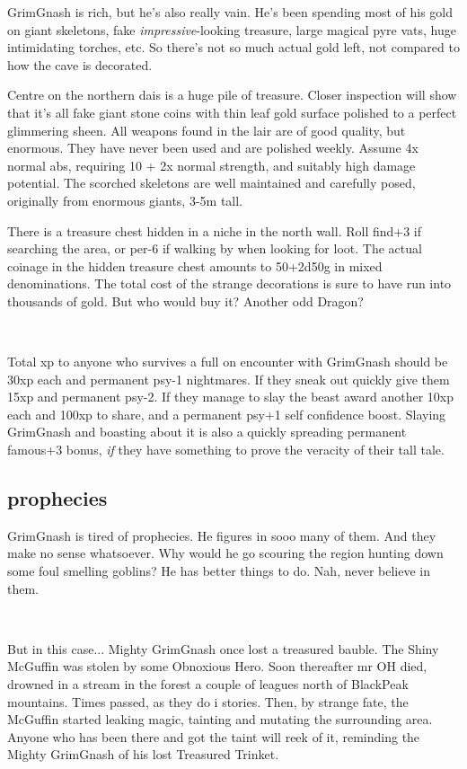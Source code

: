 GrimGnash is rich, but he's also really vain. He's been spending most of his gold on giant skeletons, fake \emph{impressive}-looking treasure, large magical pyre vats, huge intimidating torches, etc. So there's not so much actual gold left, not compared to how the cave is decorated. 

Centre on the northern dais is a huge pile of treasure. Closer inspection will show that it's all fake giant stone coins with thin leaf gold surface polished to a perfect glimmering sheen.
All weapons found in the lair are of good quality, but enormous. They have never been used and are polished weekly. Assume 4x normal abs, requiring 10 + 2x normal strength, and suitably high damage potential. The scorched skeletons are well maintained and carefully posed, originally from enormous giants, 3-5m tall.

There is a treasure chest hidden in a niche in the north wall. Roll find+3 if searching the area, or per-6 if walking by when looking for loot. The actual coinage in the hidden treasure chest amounts to 50+2d50g in mixed denominations. The total cost of the strange decorations is sure to have run into thousands of gold. But who would buy it? Another odd Dragon?

\

Total xp to anyone who survives a full on encounter with GrimGnash should be 30xp each and permanent psy-1 nightmares. If they sneak out quickly give them 15xp and permanent psy-2. If they manage to slay the beast award another 10xp each and 100xp to share, and a permanent psy+1 self confidence boost. Slaying GrimGnash and boasting about it is also a quickly spreading permanent famous+3 bonus, \emph{if} they have something to prove the veracity of their tall tale.


\subsection*{prophecies}

GrimGnash is tired of prophecies. He figures in sooo many of them. And they make no sense whatsoever. Why would he go scouring the region hunting down some foul smelling goblins? He has better things to do. Nah, never believe in them.

\

But in this case... Mighty GrimGnash once lost a treasured bauble. The Shiny McGuffin was stolen by some Obnoxious Hero. Soon thereafter mr OH died, drowned in a stream in the forest a couple of leagues north of BlackPeak mountains. Times passed, as they do i stories. Then, by strange fate, the McGuffin started leaking magic, tainting and mutating the surrounding area. Anyone who has been there and got the taint will reek of it, reminding the Mighty GrimGnash of his lost Treasured Trinket. 

